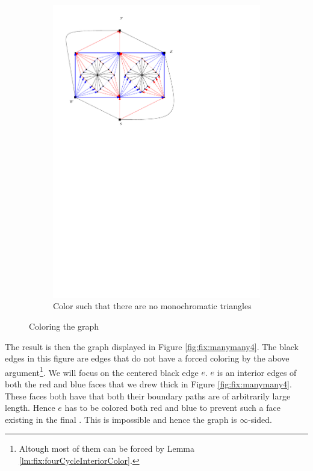 \begin{figure}[h]
\begin{subfigure}[t]{0.3\textwidth}
      \includegraphics[width=\textwidth]{fixExtension/img/manymany3}
      \caption{Color such that there are no monochromatic triangles}
      \label{fig:fix:manymany3}
    \end{subfigure}
    \caption{Coloring the graph}
    \label{fig:fix:coloring}
  \end{figure}

  The result is then the graph displayed in Figure \ref{fig:fix:manymany4}. The black edges in this figure are edges that do not have a forced coloring by the above argument\footnote{Altough most of them can be forced by Lemma \ref{lm:fix:fourCycleInteriorColor}.}.
  We will focus on the centered black edge $e$. $e$ is an interior edges of both the red and blue faces that we drew thick in Figure \ref{fig:fix:manymany4}. These faces both have that both their boundary paths are of arbitrarily large length. Hence $e$ has to be colored both red and blue to prevent such a face existing in the final \rel. This is impossible and hence the graph is $\infty$-sided.

